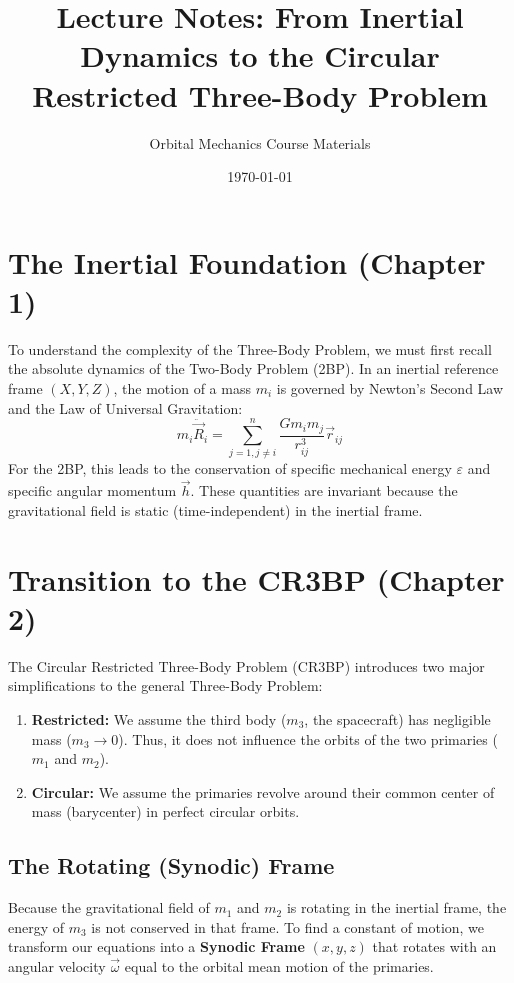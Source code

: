 \documentclass[11pt, a4paper]{article}
\title{Lecture Notes: From Inertial Dynamics to the Circular Restricted Three-Body Problem}
\author{Orbital Mechanics Course Materials}
\date{\today}
\begin{document}
\maketitle

\section{The Inertial Foundation (Chapter 1)}
To understand the complexity of the Three-Body Problem, we must first recall the absolute dynamics of the Two-Body Problem (2BP). In an inertial reference frame $(X, Y, Z)$, the motion of a mass $m_i$ is governed by Newton's Second Law and the Law of Universal Gravitation:
\begin{equation}
    m_i \ddot{\vec{R}}_i = \sum_{j=1, j \neq i}^{n} \frac{G m_i m_j}{r_{ij}^3} \vec{r}_{ij}
\end{equation}
For the 2BP, this leads to the conservation of specific mechanical energy $\varepsilon$ and specific angular momentum $\vec{h}$. These quantities are invariant because the gravitational field is static (time-independent) in the inertial frame.

\section{Transition to the CR3BP (Chapter 2)}
The Circular Restricted Three-Body Problem (CR3BP) introduces two major simplifications to the general Three-Body Problem:
\begin{enumerate}
    \item \textbf{Restricted:} We assume the third body ($m_3$, the spacecraft) has negligible mass ($m_3 \to 0$). Thus, it does not influence the orbits of the two primaries ($m_1$ and $m_2$).
    \item \textbf{Circular:} We assume the primaries revolve around their common center of mass (barycenter) in perfect circular orbits.
\end{enumerate}

\subsection{The Rotating (Synodic) Frame}
Because the gravitational field of $m_1$ and $m_2$ is rotating in the inertial frame, the energy of $m_3$ is not conserved in that frame. To find a constant of motion, we transform our equations into a \textbf{Synodic Frame} $(x, y, z)$ that rotates with an angular velocity $\vec{\omega}$ equal to the orbital mean motion of the primaries.
\end{document}
